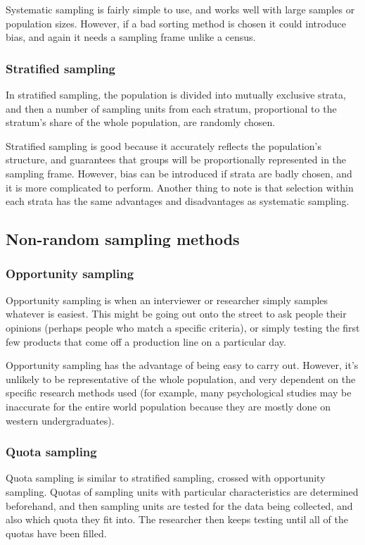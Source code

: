 Systematic sampling is fairly simple to use, and works well with large samples or population sizes. However, if a bad sorting method is chosen it could introduce bias, and again it needs a sampling frame unlike a census.

\subsubsection{Stratified sampling}
In stratified sampling, the population is divided into mutually exclusive strata, and then a number of sampling units from each stratum, proportional to the stratum's share of the whole population, are randomly chosen.

Stratified sampling is good because it accurately reflects the population's structure, and guarantees that groups will be proportionally represented in the sampling frame. However, bias can be introduced if strata are badly chosen, and it is more complicated to perform. Another thing to note is that selection within each strata has the same advantages and disadvantages as systematic sampling.

\subsection{Non-random sampling methods}
\subsubsection{Opportunity sampling}
Opportunity sampling is when an interviewer or researcher simply samples whatever is easiest. This might be going out onto the street to ask people their opinions (perhaps people who match a specific criteria), or simply testing the first few products that come off a production line on a particular day.

Opportunity sampling has the advantage of being easy to carry out. However, it's unlikely to be representative of the whole population, and very dependent on the specific research methods used (for example, many psychological studies may be inaccurate for the entire world population because they are mostly done on western undergraduates).

\subsubsection{Quota sampling}
Quota sampling is similar to stratified sampling, crossed with opportunity sampling. Quotas of sampling units with particular characteristics are determined beforehand, and then sampling units are tested for the data being collected, and also which quota they fit into. The researcher then keeps testing until all of the quotas have been filled.

